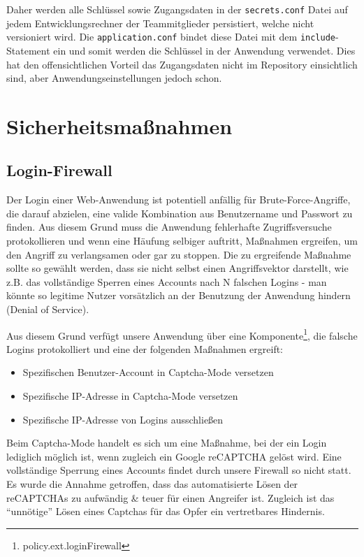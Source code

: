 \documentclass[12pt,DIV14,BCOR10mm,a4paper,parskip=half-,headsepline,headinclude,english,ngerman,bibliography=totocnumbered]{scrreprt}
\begin{document}
Daher werden alle Schlüssel sowie Zugangsdaten in der \texttt{secrets.conf} Datei auf jedem Entwicklungsrechner der Teammitglieder persistiert, welche nicht versioniert wird. Die \texttt{application.conf} bindet diese Datei mit dem \texttt{include}-Statement ein und somit werden die Schlüssel in der Anwendung verwendet. Dies hat den offensichtlichen Vorteil das Zugangsdaten nicht im Repository einsichtlich sind, aber Anwendungseinstellungen jedoch schon.

\chapter{Sicherheitsmaßnahmen}

\section{Login-Firewall}
Der Login einer Web-Anwendung ist potentiell anfällig für Brute-Force-Angriffe, die darauf abzielen, eine valide Kombination aus Benutzername und Passwort zu finden. Aus diesem Grund muss die Anwendung fehlerhafte Zugriffsversuche protokollieren und wenn eine Häufung selbiger auftritt, Maßnahmen ergreifen, um den Angriff zu verlangsamen oder gar zu stoppen. Die zu ergreifende Maßnahme sollte so gewählt werden, dass sie nicht selbst einen Angriffsvektor darstellt, wie z.B. das vollständige Sperren eines Accounts nach N falschen Logins - man könnte so legitime Nutzer vorsätzlich an der Benutzung der Anwendung hindern (Denial of Service).

Aus diesem Grund verfügt unsere Anwendung über eine Komponente\footnote{policy.ext.loginFirewall}, die falsche Logins protokolliert und eine der folgenden Maßnahmen ergreift:

\begin{itemize}
\item Spezifischen Benutzer-Account in Captcha-Mode versetzen
\item Spezifische IP-Adresse in Captcha-Mode versetzen
\item Spezifische IP-Adresse von Logins ausschließen
\end{itemize}

Beim Captcha-Mode handelt es sich um eine Maßnahme, bei der ein Login lediglich möglich ist, wenn zugleich ein Google reCAPTCHA gelöst wird. Eine vollständige Sperrung eines Accounts findet durch unsere Firewall so nicht statt. Es wurde die Annahme getroffen, dass das automatisierte Lösen der reCAPTCHAs zu aufwändig \& teuer für einen Angreifer ist. Zugleich ist das \enquote{unnötige} Lösen eines Captchas für das Opfer ein vertretbares Hindernis.
\end{document}
